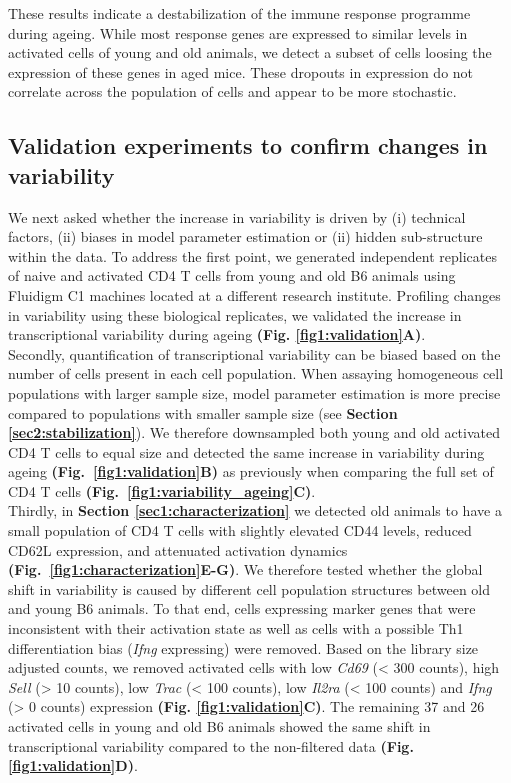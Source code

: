 These results indicate a destabilization of the immune response programme during ageing. While most response genes are expressed to similar levels in activated cells of young and old animals, we detect a subset of cells loosing the expression of these genes in aged mice. These dropouts in expression do not correlate across the population of cells and appear to be more stochastic. 

\subsection{Validation experiments to confirm changes in variability}

We next asked whether the increase in variability is driven by (i) technical factors, (ii) biases in model parameter estimation or (ii) hidden sub-structure within the data. To address the first point, we generated independent replicates of naive and activated CD4\plus{} T cells from young and old B6 animals using Fluidigm C1 machines located at a different research institute. Profiling changes in variability using these biological replicates, we validated the increase in transcriptional variability during ageing \textbf{(Fig. \ref{fig1:validation}A)}.\\

Secondly, quantification of transcriptional variability can be biased based on the number of cells present in each cell population. When assaying homogeneous cell populations with larger sample size, model parameter estimation is more precise compared to populations with smaller sample size (see \textbf{Section \ref{sec2:stabilization}}). We therefore downsampled both young and old activated CD4\plus{} T cells to equal size and detected the same increase in variability during ageing \textbf{(Fig.~\ref{fig1:validation}B)} as previously when comparing the full set of CD4\plus{} T cells \textbf{(Fig.~\ref{fig1:variability_ageing}C)}. \\

Thirdly, in \textbf{Section \ref{sec1:characterization}} we detected old animals to have a small population of CD4\plus{} T cells with slightly elevated CD44 levels, reduced CD62L expression, and attenuated activation dynamics \textbf{(Fig.~\ref{fig1:characterization}E-G)}. We therefore tested whether the global shift in variability is caused by different cell population structures between old and young B6 animals. To that end, cells expressing marker genes that were inconsistent with their activation state as well as cells with a possible Th1 differentiation bias (\textit{Ifng} expressing) were removed. Based on the library size adjusted counts, we removed activated cells with low \textit{Cd69} (< 300 counts), high \textit{Sell} (> 10 counts), low \textit{Trac} (< 100 counts), low \textit{Il2ra} (< 100 counts) and \textit{Ifng} (> 0 counts) expression \textbf{(Fig. \ref{fig1:validation}C)}. The remaining 37 and 26 activated cells in young and old B6 animals showed the same shift in transcriptional variability compared to the non-filtered data \textbf{(Fig. \ref{fig1:validation}D)}. 

